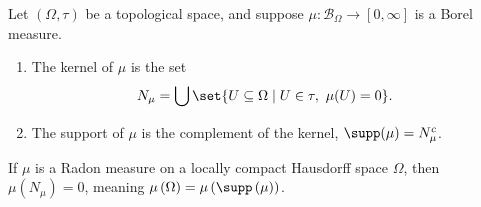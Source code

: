 \begin{definition}
  Let $\left(\Omega,\tau\right)$ be a topological space, and suppose $\mu: \mathcal{B}_{\Omega}\rightarrow [0,\infty]$ is a Borel measure.
  \begin{enumerate}[(1)]
    \item The kernel of $\mu$ is the set
      \begin{align*}
        N_{\mu} &= \bigcup\set{U\subseteq \Omega\mid U\in\tau,~\mu(U) = 0}.
      \end{align*}
    \item The support of $\mu$ is the complement of the kernel, $\supp(\mu) = N_{\mu}^{c}$.
  \end{enumerate}
\end{definition}
\begin{fact}
  If $\mu$ is a Radon measure on a locally compact Hausdorff space $\Omega$, then $\mu\left(N_{\mu}\right) = 0$, meaning $\mu\left(\Omega\right) = \mu\left(\supp\left(\mu\right)\right)$.
\end{fact}

